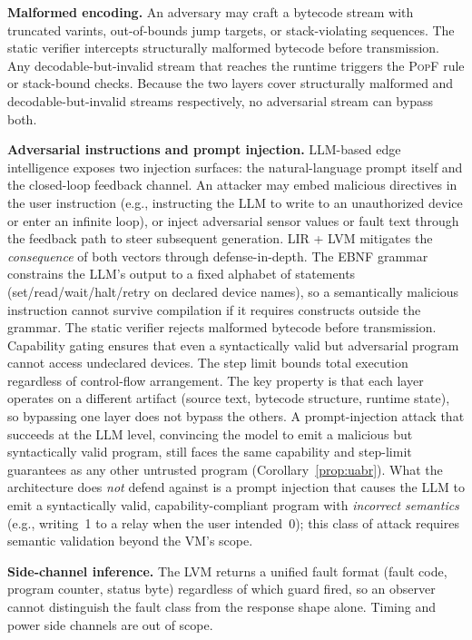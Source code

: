 \documentclass[a4paper,fleqn,longmktitle]{cas-dc}
\begin{document}
\noindent\textbf{Malformed encoding.} An adversary may craft a bytecode stream with truncated varints, out-of-bounds jump targets, or stack-violating sequences. The static verifier intercepts structurally malformed bytecode before transmission. Any decodable-but-invalid stream that reaches the runtime triggers the \textsc{PopF} rule or stack-bound checks. Because the two layers cover structurally malformed and decodable-but-invalid streams respectively, no adversarial stream can bypass both.

\noindent\textbf{Adversarial instructions and prompt injection.} LLM-based edge intelligence exposes two injection surfaces: the natural-language prompt itself and the closed-loop feedback channel. An attacker may embed malicious directives in the user instruction (e.g., instructing the LLM to write to an unauthorized device or enter an infinite loop), or inject adversarial sensor values or fault text through the feedback path to steer subsequent generation. LIR + LVM mitigates the \emph{consequence} of both vectors through defense-in-depth. The EBNF grammar constrains the LLM's output to a fixed alphabet of statements (set/read/wait/halt/retry on declared device names), so a semantically malicious instruction cannot survive compilation if it requires constructs outside the grammar. The static verifier rejects malformed bytecode before transmission. Capability gating ensures that even a syntactically valid but adversarial program cannot access undeclared devices. The step limit bounds total execution regardless of control-flow arrangement. The key property is that each layer operates on a different artifact (source text, bytecode structure, runtime state), so bypassing one layer does not bypass the others. A prompt-injection attack that succeeds at the LLM level, convincing the model to emit a malicious but syntactically valid program, still faces the same capability and step-limit guarantees as any other untrusted program (Corollary~\ref{prop:uabr}). What the architecture does \emph{not} defend against is a prompt injection that causes the LLM to emit a syntactically valid, capability-compliant program with \emph{incorrect semantics} (e.g., writing~1 to a relay when the user intended~0); this class of attack requires semantic validation beyond the VM's scope.

\noindent\textbf{Side-channel inference.} The LVM returns a unified fault format (fault code, program counter, status byte) regardless of which guard fired, so an observer cannot distinguish the fault class from the response shape alone. Timing and power side channels are out of scope.
\end{document}
